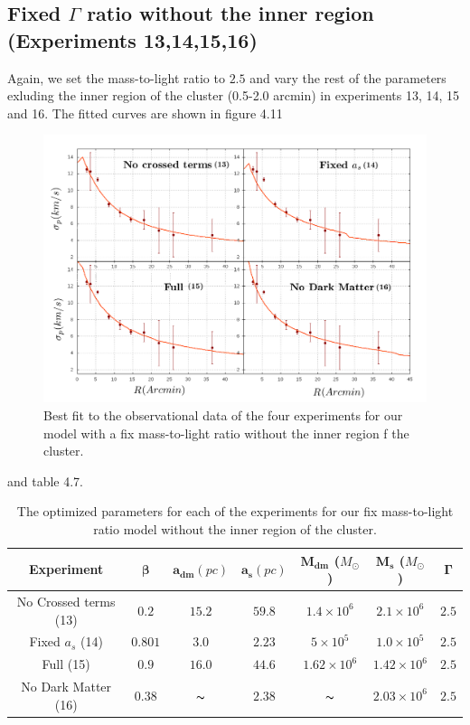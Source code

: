 \subsection{Fixed $\Gamma$ ratio without the inner region (Experiments 13,14,15,16)}

Again, we set the mass-to-light ratio to $2.5$ and vary the rest of the parameters exluding the inner region of the cluster (0.5-2.0 arcmin) in experiments 13, 14, 15 and 16. The fitted curves are shown in figure 4.11

\begin{figure}[H]
\centering
\includegraphics[width=15cm]{images/fix_gamma_refinado_10.png}
\caption[Best fit of our model with a fix mass-to-light ratio without the inner region]{Best fit to the observational data of the four experiments for our model with a fix mass-to-light ratio without the inner region f the cluster.}
\end{figure}

 and table 4.7.

\begin{table}[H]
\begin{center}
\begin{tabular}{| c| c| c| c| c| c| c|}
    \hline
    \textbf{Experiment} & $\mathbf{\beta}$ & $\mathbf{a_{dm}} (pc)$ & $\mathbf{a_{s}} (pc)$ & $\mathbf{M_{dm}}$ ($M_{\odot}$) & $\mathbf{M_{s}}$ ($M_{\odot}$) & $\mathbf{\Gamma}$\\ \hline
	No Crossed terms (13) & $0.2$ &	$15.2$ &	$59.8$ &	$1.4 \times 10^{6}$ &	$2.1 \times 10^{6}$ &	$2.5$\\ \hline
	Fixed $a_s$ (14) &	$0.801$ &	$3.0$ &	$2.23$ &	$5 \times 10^{5}$ &	$1.0 \times 10 ^{5}$ &	$2.5$\\ \hline
	Full (15) &	$0.9$ &	$16.0$ &	$44.6$ &	$1.62 \times 10^{6}$ &	$1.42 \times 10^{6}$ &	$2.5$\\ \hline
	No Dark Matter (16) &	$0.38$ &	$\thicksim$ & $ 2.38$ &	$\thicksim$ & $  2.03 \times 10^{6}$ & 	$2.5$\\
    \hline
  \end{tabular} 
\caption[Optimized parameters for our fix mass-to-light ratio model without the inner region.]{The optimized parameters for each of the experiments for our fix mass-to-light ratio model without the inner region of the cluster.}
\end{center}
\end{table} 

